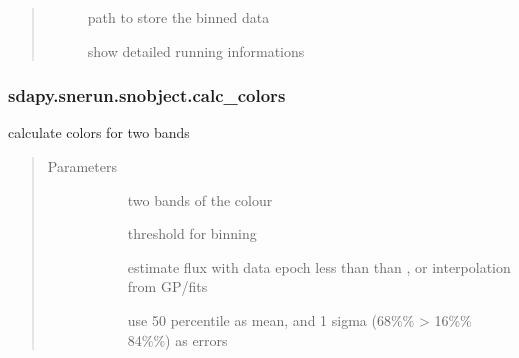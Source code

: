 \documentclass[letterpaper,10pt,english]{sphinxmanual}
\begin{document}
\begin{fulllineitems}
\begin{fulllineitems}
\begin{quote}
\begin{description}
\begin{description}
\item[{}] \leavevmode{[}\sphinxtitleref{str}{]}
path to store the binned data

\item[{}] \leavevmode
show detailed running informations

\end{description}

\end{description}\end{quote}

\end{fulllineitems}



\subsubsection{sdapy.snerun.snobject.calc\_colors}
\label{\detokenize{generated/sdapy.snerun.snobject.calc_colors:sdapy-snerun-snobject-calc-colors}}\label{\detokenize{generated/sdapy.snerun.snobject.calc_colors::doc}}

\begin{fulllineitems}
\label{\detokenize{generated/sdapy.snerun.snobject.calc_colors:sdapy.snerun.snobject.calc_colors}}
calculate colors for two bands
\begin{quote}\begin{description}
\item[{Parameters}] \leavevmode\begin{description}
\item[{}] \leavevmode{[}\sphinxtitleref{list}{]}
two bands of the colour

\item[{}] \leavevmode{[}\sphinxtitleref{float}{]}
threshold for binning

\item[{}] \leavevmode{[}\sphinxtitleref{str}{]}
estimate flux with data epoch less than than , or interpolation from GP/fits

\item[{}] \leavevmode{[}\sphinxtitleref{list}{]}
use 50 percentile as mean, and 1 sigma (68\%\% \sphinxhyphen{}\textgreater{} 16\%\% \sphinxhyphen{} 84\%\%) as errors


\end{description}
\end{description}
\end{quote}
\end{fulllineitems}
\end{fulllineitems}
\end{document}
